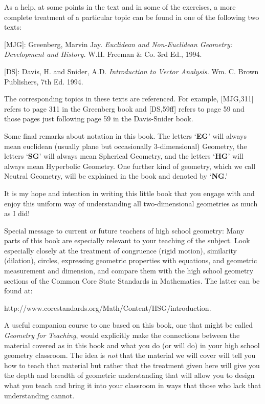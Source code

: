 \documentclass[handout]{ximera}
\begin{document}
As a help, at some points in the text and in some of the exercises, a more
complete treatment of a particular topic can be found in one of the following
two texts:

[MJG]: Greenberg, Marvin Jay. \textit{Euclidean and Non-Euclidean Geometry:
Development and History.} W.H. Freeman \& Co. 3rd Ed., 1994.

[DS]: Davis, H. and Snider, A.D. \textit{Introduction to Vector Analysis.} Wm.
C. Brown Publishers, 7th Ed. 1994.

The corresponding topics in these texts are referenced. For example, [MJG,311]
refers to page 311 in the Greenberg book and [DS,59ff] refers to page 59 and
those pages just following page 59 in the Davis-Snider book.

Some final remarks about notation in this book. The letters `\textbf{EG}' will
always mean euclidean (usually plane but occasionally $3$-dimensional)
Geometry, the letters `\textbf{SG}' will always mean Spherical Geometry, and
the letters `\textbf{HG}' will always mean Hyperbolic Geometry. One further
kind of geometry, which we call Neutral Geometry, will be explained in the
book and denoted by `\textbf{NG}.'



It is my hope and intention in writing this little book that you engage with
and enjoy this uniform way of understanding all two-dimensional geometries as
much as I did!

\begin{remark}
Special message to current or future teachers of high school geometry:
Many parts of this book are especially relevant to your teaching of
the subject. Look especially closely at the treatment of congruence
(rigid motion), similarity (dilation), circles, expressing geometric
properties with equations, and geometric measurement and dimension,
and compare them with the high school geometry sections of the Common
Core State Standards in Mathematics. The latter can be found at:
\end{remark}

\begin{center}
http://www.corestandards.org/Math/Content/HSG/introduction.
\end{center}

A useful companion course to one based on this book, one that might be
called \textit{Geometry for Teaching}, would explicitly make the
connections between the material covered as in this book and what you
do (or will do) in your high school geometry classroom. The idea is
\textit{not} that the material we will cover will tell you how to
teach that material but rather that the treatment given here will give
you the depth and breadth of geometric understanding that will allow
you to design what you teach and bring it into your classroom in ways
that those who lack that understanding cannot.
\end{document}
